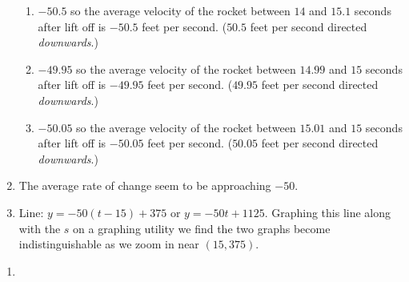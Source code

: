 \begin{exenum}
\begin{enumerate}
\begin{enumerate}
\item  $-50.5$ so the average velocity of the rocket between $14$ and $15.1$ seconds after lift off is $-50.5$ feet per second. ($50.5$ feet per second directed \textit{downwards}.)

\item  $-49.95$ so the average velocity of the rocket between $14.99$ and $15$ seconds after lift off is $-49.95$ feet per second. ($49.95$ feet per second directed \textit{downwards}.)

\item   $-50.05$ so the average velocity of the rocket between $15.01$ and $15$ seconds after lift off is $-50.05$ feet per second. ($50.05$ feet per second directed \textit{downwards}.)
\end{enumerate}


\item  The average rate of change seem to be approaching $-50$.

\item  Line:  $y = -50(t-15) + 375$ or $y =   -50t + 1125$.  Graphing this line along with the $s$ on a graphing utility we find the two graphs become indistinguishable as we zoom in near $(15, 375)$.

\end{enumerate}

\addtocounter{enumi}{3}

\item \begin{enumerate}

 \item


  \end{enumerate}

\end{exenum}
